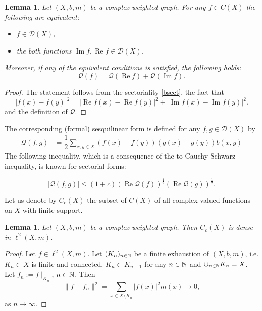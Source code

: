 \documentclass[10pt,a4paper]{amsart}
\newtheorem{lemma}[theorem]{Lemma}
\renewcommand{\Re}{\operatorname{Re}}%
\renewcommand{\Im}{\operatorname{Im}}%
\newcommand{\D}{\mathcal{D}}
\begin{document}
\begin{lemma}\label{lem::complexf}
Let $(X,b,m)$ be a complex-weighted graph. For any $f\in C(X)$ the following are equivalent:
\begin{itemize}
\item
$f\in \D(X)$,
 \item
 the both  functions $\Im f, \Re f\in \D(X)$.

 \end{itemize} 
 Moreover, if  any of the equivalent conditions is satisfied, the following holds:
\begin{equation}\label{eq::QfQRefQImf}
\mathcal Q(f)=\mathcal Q(\Re f)+\mathcal Q(\Im f).
\end{equation}
\end{lemma}
\begin{proof}
The statement follows from the sectoriality \eqref{bsect}, the fact that
$$
|f(x)-f(y)|^2=|\Re f(x)-\Re f(y)|^2+|\Im f(x)-\Im f(y)|^2.
$$
and the definition of $\mathcal Q$.
\end{proof}



The corresponding (formal) sesquilinear form is defined for any $f,g\in \D(X)$ by
\begin{align*}
\mathcal Q(f,g)&=\dfrac12 \sum_{x,y\in X}{(f(x)-f(y))}\overline{(g(x)-g(y))}b(x,y)
\end{align*}
The following inequality, which is a consequence of the to Cauchy-Schwarz inequality, is known for sectorial forms:

\begin{equation}\label{eq::CSforsect}
|\mathcal Q(f,g)|\le (1+c) \left(\Re \mathcal Q(f)\right)^\frac{1}{2} \left(\Re \mathcal Q(g)\right)^\frac{1}{2}.
\end{equation}



\bigskip
 Let us denote by $C_c(X)$ the subset of $C(X)$ of all complex-valued functions on $X$ with finite support.


\begin{lemma}
Let $(X,b,m)$ be a complex-weighted graph. Then $C_c(X)$ is dense in $\ell^2(X,m)$.
\end{lemma}

\begin{proof}
Let $f\in \ell^2(X,m)$. Let $(K_n)_{n\in \Bbb N}$ be a finite exhaustion of $(X, b, m)$, i.e. $K_n\subset X$ is finite and connected,  $K_{n}\subset K_{n+1}$ for any $n\in \Bbb N$ and $\cup_{n\in \Bbb N} K_n=X$. Let $f_n:=f\mid_{K_n}$, $n\in \Bbb N$. Then
$$
\|f-f_n\|^2=\sum_{x\in X\setminus K_n}|f(x)|^2m(x)\to 0,
$$
as $n\to\infty$.
\end{proof}
\end{document}
